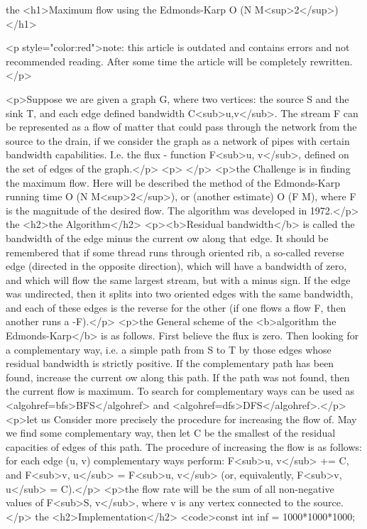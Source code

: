 the <h1>Maximum flow using the Edmonds-Karp O (N M<sup>2</sup>)</h1>

<p style="color:red">note: this article is outdated and contains errors and not recommended reading. After some time the article will be completely rewritten.</p>

<p>Suppose we are given a graph G, where two vertices: the source S and the sink T, and each edge defined bandwidth C<sub>u,v</sub>. The stream F can be represented as a flow of matter that could pass through the network from the source to the drain, if we consider the graph as a network of pipes with certain bandwidth capabilities. I.e. the flux - function F<sub>u, v</sub>, defined on the set of edges of the graph.</p>
<p> </p>
<p>the Challenge is in finding the maximum flow. Here will be described the method of the Edmonds-Karp running time O (N M<sup>2</sup>), or (another estimate) O (F M), where F is the magnitude of the desired flow. The algorithm was developed in 1972.</p>
the <h2>the Algorithm</h2>
<p><b>Residual bandwidth</b> is called the bandwidth of the edge minus the current ow along that edge. It should be remembered that if some thread runs through oriented rib, a so-called reverse edge (directed in the opposite direction), which will have a bandwidth of zero, and which will flow the same largest stream, but with a minus sign. If the edge was undirected, then it splits into two oriented edges with the same bandwidth, and each of these edges is the reverse for the other (if one flows a flow F, then another runs a -F).</p>
<p>the General scheme of the <b>algorithm the Edmonds-Karp</b> is as follows. First believe the flux is zero. Then looking for a complementary way, i.e. a simple path from S to T by those edges whose residual bandwidth is strictly positive. If the complementary path has been found, increase the current ow along this path. If the path was not found, then the current flow is maximum. To search for complementary ways can be used as <algohref=bfs>BFS</algohref> and <algohref=dfs>DFS</algohref>.</p>
<p>let us Consider more precisely the procedure for increasing the flow of. May we find some complementary way, then let C be the smallest of the residual capacities of edges of this path. The procedure of increasing the flow is as follows: for each edge (u, v) complementary ways perform: F<sub>u, v</sub> += C, and F<sub>v, u</sub> = F<sub>u, v</sub> (or, equivalently, F<sub>v, u</sub> = C).</p>
<p>the flow rate will be the sum of all non-negative values of F<sub>S, v</sub>, where v is any vertex connected to the source.</p>
the <h2>Implementation</h2>
<code>const int inf = 1000*1000*1000;


